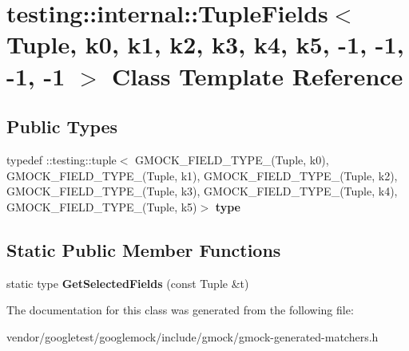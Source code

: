 \hypertarget{classtesting_1_1internal_1_1_tuple_fields_3_01_tuple_00_01k0_00_01k1_00_01k2_00_01k3_00_01k4_00_fc3c297a037e5312ea5ea32562e3997e}{}\section{testing\+:\+:internal\+:\+:Tuple\+Fields$<$ Tuple, k0, k1, k2, k3, k4, k5, -\/1, -\/1, -\/1, -\/1 $>$ Class Template Reference}
\label{classtesting_1_1internal_1_1_tuple_fields_3_01_tuple_00_01k0_00_01k1_00_01k2_00_01k3_00_01k4_00_fc3c297a037e5312ea5ea32562e3997e}
\subsection*{Public Types}
\begin{DoxyCompactItemize}
\item 
\mbox{\label{classtesting_1_1internal_1_1_tuple_fields_3_01_tuple_00_01k0_00_01k1_00_01k2_00_01k3_00_01k4_00_fc3c297a037e5312ea5ea32562e3997e_a4e9aef3e026c3b30cfc21b6776616926}} 
typedef \+::testing\+::tuple$<$ G\+M\+O\+C\+K\+\_\+\+F\+I\+E\+L\+D\+\_\+\+T\+Y\+P\+E\+\_\+(Tuple, k0), G\+M\+O\+C\+K\+\_\+\+F\+I\+E\+L\+D\+\_\+\+T\+Y\+P\+E\+\_\+(Tuple, k1), G\+M\+O\+C\+K\+\_\+\+F\+I\+E\+L\+D\+\_\+\+T\+Y\+P\+E\+\_\+(Tuple, k2), G\+M\+O\+C\+K\+\_\+\+F\+I\+E\+L\+D\+\_\+\+T\+Y\+P\+E\+\_\+(Tuple, k3), G\+M\+O\+C\+K\+\_\+\+F\+I\+E\+L\+D\+\_\+\+T\+Y\+P\+E\+\_\+(Tuple, k4), G\+M\+O\+C\+K\+\_\+\+F\+I\+E\+L\+D\+\_\+\+T\+Y\+P\+E\+\_\+(Tuple, k5)$>$ {\bfseries type}
\end{DoxyCompactItemize}
\subsection*{Static Public Member Functions}
\begin{DoxyCompactItemize}
\item 
\mbox{\label{classtesting_1_1internal_1_1_tuple_fields_3_01_tuple_00_01k0_00_01k1_00_01k2_00_01k3_00_01k4_00_fc3c297a037e5312ea5ea32562e3997e_a15b4c351182e3b52ec7ce67cb6beb0f8}} 
static type {\bfseries Get\+Selected\+Fields} (const Tuple \&t)
\end{DoxyCompactItemize}


The documentation for this class was generated from the following file\+:\begin{DoxyCompactItemize}
\item 
vendor/googletest/googlemock/include/gmock/gmock-\/generated-\/matchers.\+h\end{DoxyCompactItemize}
